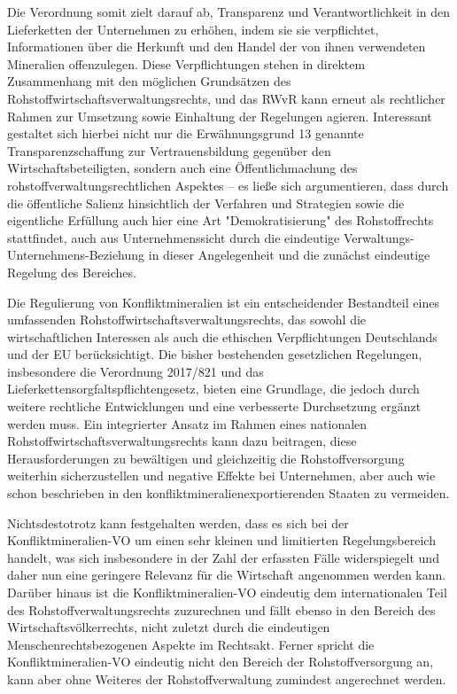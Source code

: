 \documentclass[12pt,a4paper,oneside]{book} %
\begin{document}
	Die Verordnung somit zielt darauf ab, Transparenz und Verantwortlichkeit in den Lieferketten der Unternehmen zu erhöhen, indem sie sie verpflichtet, Informationen über die Herkunft und den Handel der von ihnen verwendeten Mineralien offenzulegen. Diese Verpflichtungen stehen in direktem Zusammenhang mit den möglichen Grundsätzen des Rohstoffwirtschaftsverwaltungsrechts, und das RWvR kann erneut als rechtlicher Rahmen zur Umsetzung sowie Einhaltung der Regelungen agieren. Interessant gestaltet sich hierbei nicht nur die Erwähnungsgrund 13 genannte Transparenzschaffung zur Vertrauensbildung gegenüber den Wirtschaftsbeteiligten, sondern auch eine Öffentlichmachung des rohstoffverwaltungsrechtlichen Aspektes -- es ließe sich argumentieren, dass durch die öffentliche Salienz hinsichtlich der Verfahren und Strategien sowie die eigentliche Erfüllung auch hier eine Art "Demokratisierung" des Rohstoffrechts stattfindet, auch aus Unternehmenssicht durch die eindeutige Verwaltungs-Unternehmens-Beziehung in dieser Angelegenheit und die zunächst eindeutige Regelung des Bereiches.
	
	Die Regulierung von Konfliktmineralien ist ein entscheidender Bestandteil eines umfassenden Rohstoffwirtschaftsverwaltungsrechts, das sowohl die wirtschaftlichen Interessen als auch die ethischen Verpflichtungen Deutschlands und der EU berücksichtigt. Die bisher bestehenden gesetzlichen Regelungen, insbesondere die Verordnung  2017/821 und das Lieferkettensorgfaltspflichtengesetz, bieten eine Grundlage, die jedoch durch weitere rechtliche Entwicklungen und eine verbesserte Durchsetzung ergänzt werden muss. Ein integrierter Ansatz im Rahmen eines nationalen Rohstoffwirtschaftsverwaltungsrechts kann dazu beitragen, diese Herausforderungen zu bewältigen und gleichzeitig die Rohstoffversorgung weiterhin sicherzustellen und negative Effekte bei Unternehmen, aber auch wie schon beschrieben in den konfliktmineralienexportierenden Staaten zu vermeiden.
	
	Nichtsdestotrotz kann festgehalten werden, dass es sich bei der Konfliktmineralien-VO um einen sehr kleinen und limitierten Regelungsbereich handelt, was sich insbesondere in der Zahl der erfassten Fälle widerspiegelt und daher nun eine geringere Relevanz für die Wirtschaft angenommen werden kann. Darüber hinaus ist die Konfliktmineralien-VO eindeutig dem internationalen Teil des Rohstoffverwaltungsrechts zuzurechnen und fällt ebenso in den Bereich des Wirtschaftsvölkerrechts, nicht zuletzt durch die eindeutigen Menschenrechtsbezogenen Aspekte im Rechtsakt. Ferner spricht die Konfliktmineralien-VO eindeutig nicht den Bereich der Rohstoffversorgung an, kann aber ohne Weiteres der Rohstoffverwaltung zumindest angerechnet werden.
	
\end{document}
